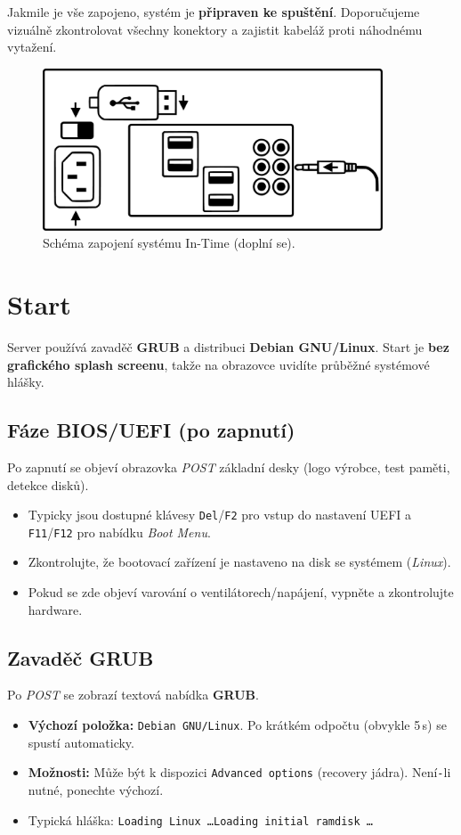 \documentclass[11pt,a4paper]{book}
\begin{document}
Jakmile je vše zapojeno, systém je \textbf{připraven ke spuštění}. Doporučujeme vizuálně zkontrolovat všechny konektory a zajistit kabeláž proti náhodnému vytažení.

\medskip
\begin{figure}[h]
  \centering
  \includegraphics[width=0.9\textwidth]{img/pc_schema.pdf}\par
  \caption{Schéma zapojení systému In-Time (doplní se).}
\end{figure}

\section{Start}
\noindent
Server používá zavaděč \textbf{GRUB} a distribuci \textbf{Debian GNU/Linux}. Start je \textbf{bez grafického splash screenu}, takže na obrazovce uvidíte průběžné systémové hlášky.

\subsection{Fáze BIOS/UEFI (po zapnutí)}
Po zapnutí se objeví obrazovka \emph{POST} základní desky (logo výrobce, test paměti, detekce disků).
\begin{itemize}
  \item Typicky jsou dostupné klávesy \texttt{Del}/\texttt{F2} pro vstup do nastavení UEFI a \texttt{F11}/\texttt{F12} pro nabídku \emph{Boot Menu}.
  \item Zkontrolujte, že bootovací zařízení je nastaveno na disk se systémem (\emph{Linux}).
  \item Pokud se zde objeví varování o ventilátorech/napájení, vypněte a zkontrolujte hardware.
\end{itemize}

\subsection{Zavaděč GRUB}
Po \emph{POST} se zobrazí textová nabídka \textbf{GRUB}.
\begin{itemize}
  \item \textbf{Výchozí položka:} \texttt{Debian GNU/Linux}. Po krátkém odpočtu (obvykle 5\,s) se spustí automaticky.
  \item \textbf{Možnosti:} Může být k dispozici \texttt{Advanced options} (recovery jádra). Není\texttt{-}li nutné, ponechte výchozí.
  \item Typická hláška: \texttt{Loading Linux \dots\quad Loading initial ramdisk \dots}
\end{itemize}
\end{document}
